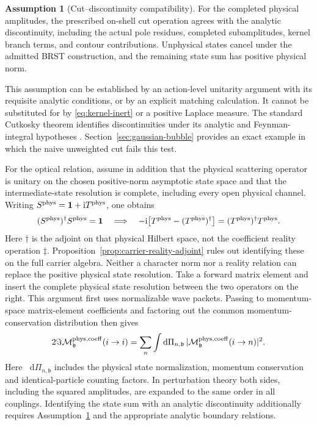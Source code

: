 \documentclass[final,5p,times,twocolumn,numbers,nopreprintline]{elsarticle}
\numberwithin{equation}{section}
\theoremstyle{definition}
\newtheorem{assumption}[theorem]{Assumption}
\theoremstyle{remark}
\newcommand{\dd}{\mathop{}\!\mathrm d}
\newcommand{\ii}{\mathrm i}
\newcommand{\bb}{\mathfrak b}
\newcommand{\one}{\mathbf 1}
\begin{document}
\begin{assumption}[Cut--discontinuity compatibility]
\label{ass:cut-matching}
For the completed physical amplitudes, the prescribed on-shell
cut operation agrees with the analytic discontinuity, including
the actual pole residues, completed subamplitudes, kernel branch
terms, and contour contributions. Unphysical states cancel under
the admitted BRST construction, and the remaining state sum has
positive physical norm.
\end{assumption}

This assumption can be established by an action-level unitarity
argument with its requisite analytic conditions, or by an explicit
matching calculation. It cannot be substituted for by
\eqref{eq:kernel-inert} or a positive Laplace measure.
The standard Cutkosky theorem identifies discontinuities under its
analytic and Feynman-integral hypotheses \cite{Cutkosky1960}.
Section~\ref{sec:gaussian-bubble} provides an exact example in which
the naive unweighted cut fails this test.

For the optical relation, assume in addition that the physical
scattering operator is unitary on the chosen positive-norm asymptotic
state space and that the intermediate-state resolution is complete,
including every open physical channel. Writing
\(S^{\rm phys}=\one+\ii T^{\rm phys}\), one obtains
\begin{equation}
 (S^{\rm phys})^\dagger S^{\rm phys}=\one
 \quad\Longrightarrow\quad
 -\ii\bigl[T^{\rm phys}-(T^{\rm phys})^\dagger\bigr]
       =(T^{\rm phys})^\dagger T^{\rm phys}.
 \label{eq:physical-unitarity-identity}
\end{equation}
Here \(\dagger\) is the adjoint on that physical Hilbert space,
not the coefficient reality operation \(\ddagger\).
Proposition~\ref{prop:carrier-reality-adjoint} rules out identifying
these on the full carrier algebra. Neither a character norm nor a
reality relation can replace the positive physical state resolution.
Take a forward matrix element and insert the complete physical
state resolution between the two operators on the right. This
argument first uses normalizable wave packets. Passing to
momentum-space matrix-element coefficients and factoring out the
common momentum-conservation distribution then gives
\begin{equation}
 2\Im\mathcal M^{\rm phys,coeff}_{\bb}(i\to i)
  =\sum_n\int\dd\Pi_{n,\bb}\,
       |\mathcal M^{\rm phys,coeff}_{\bb}(i\to n)|^2.
 \label{eq:optical}
\end{equation}
Here \(\dd\Pi_{n,\bb}\) includes the physical state normalization,
momentum conservation and identical-particle counting factors.
In perturbation theory both sides, including the squared amplitudes,
are expanded to the same order in all couplings. Identifying the state sum with an analytic
discontinuity
additionally requires Assumption~\ref{ass:cut-matching} and the
appropriate analytic boundary relations.
\end{document}
